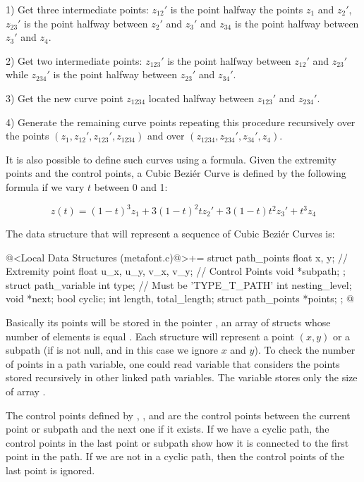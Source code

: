 1) Get three intermediate points: $z_{12}'$ is the point halfway the
points $z_1$ and $z_2'$, $z_{23}'$ is the point halfway between $z_2'$
and $z_3'$ and $z_{34}$ is the point halfway between $z_3'$ and $z_4$.

2) Get two intermediate points: $z_{123}'$ is the point halfway
between $z_{12}'$ and $z_{23}'$ while $z_{234}'$ is the point halfway
between $z_{23}'$ and $z_{34}'$.

3) Get the new curve point $z_{1234}$ located halfway between
$z_{123}'$ and $z_{234}'$.

4) Generate the remaining curve points repeating this procedure
recursively over the points $(z_1, z_{12}', z_{123}', z_{1234})$ and
over $(z_{1234}, z_{234}', z_{34}', z_4)$.

It is also possible to define such curves using a formula. Given the
extremity points and the control points, a Cubic Beziér Curve is
defined by the following formula if we vary $t$ between 0 and 1:

$$
z(t) = (1-t)^3z_1 + 3(1-t)^2tz_2' + 3(1-t)t^2z_3'+t^3z_4
$$

The data structure that will represent a sequence of Cubic Beziér
Curves is:

\iniciocodigo
@<Local Data Structures (metafont.c)@>+=
struct path_points{
  float x, y; // Extremity point
  float u_x, u_y, v_x, v_y;   // Control Points
  void *subpath;
};
struct path_variable{
  int type; // Must be 'TYPE_T_PATH'
  int nesting_level;
  void *next;
  bool cyclic;
  int length, total_length;
  struct path_points *points;
};
@
\fimcodigo

Basically its points will be stored in the
pointer , an array of structs whose number of
elements is equal . Each structure will represent a
point $(x, y)$ or a subpath (if  is not null, and
in this case we ignore $x$ and $y$). To check the number of points in
a path variable, one could read variable 
that considers the points stored recursively in other linked path
variables. The variable  stores only the size of
array .

The control points defined
by , , 
and  are the control points between the current point
or subpath and the next one if it exists. If we have a cyclic path,
the control points in the last point or subpath show how it is
connected to the first point in the path. If we are not in a cyclic
path, then the control points of the last point is ignored.

